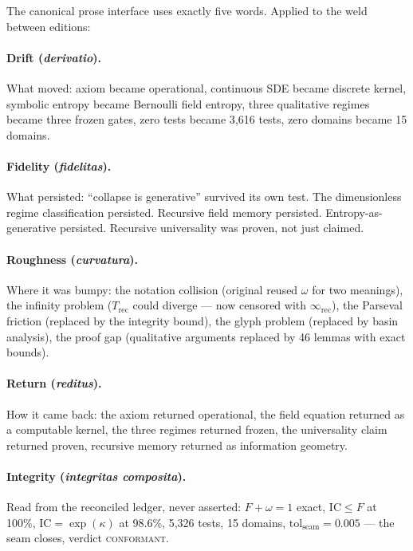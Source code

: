 \documentclass[
  aps,
  prd,
  preprint,
  superscriptaddress,
  nofootinbib,
  floatfix,
  longbibliography
]{revtex4-2}
\newcommand{\tolseam}{\mathrm{tol}_{\mathrm{seam}}}
\newcommand{\regime}[1]{\textnormal{\textsc{#1}}}
\newcommand{\conform}{\regime{conformant}}
\newcommand{\IC}{\mathrm{IC}}
\newcommand{\Fid}{F}
\newcommand{\Drft}{\omega}
\newcommand{\Logint}{\kappa}
\newcommand{\lat}[1]{\textit{#1}}
\begin{document}
The canonical prose interface uses exactly five words.
Applied to the weld between editions:

\paragraph{Drift (\lat{derivatio}).}
What moved: axiom became operational, continuous SDE became
discrete kernel, symbolic entropy became Bernoulli field
entropy, three qualitative regimes became three frozen
gates, zero tests became 3{,}616 tests, zero domains
became 15 domains.

\paragraph{Fidelity (\lat{fidelitas}).}
What persisted: ``collapse is generative'' survived
its own test. The dimensionless regime classification
persisted. Recursive field memory persisted.
Entropy-as-generative persisted. Recursive universality
was proven, not just claimed.

\paragraph{Roughness (\lat{curvatura}).}
Where it was bumpy: the notation collision
(original reused $\Drft$ for two meanings),
the infinity problem ($T_{\mathrm{rec}}$ could diverge —
now censored with $\infty_{\mathrm{rec}}$),
the Parseval friction (replaced by the integrity bound),
the glyph problem (replaced by basin analysis),
the proof gap (qualitative arguments replaced by
46 lemmas with exact bounds).

\paragraph{Return (\lat{reditus}).}
How it came back: the axiom returned operational,
the field equation returned as a computable kernel,
the three regimes returned frozen, the universality
claim returned proven, recursive memory returned as
information geometry.

\paragraph{Integrity (\lat{integritas composita}).}
Read from the reconciled ledger, never asserted:
$\Fid + \Drft = 1$ exact, $\IC \leq \Fid$ at 100\%,
$\IC = \exp(\Logint)$ at 98.6\%,
5{,}326 tests, 15 domains,
$\tolseam = 0.005$ — the seam closes,
verdict \conform{}.
\end{document}
